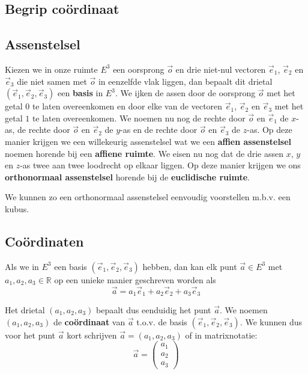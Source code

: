 \documentclass[12pt,twoside]{article}
\begin{document}
\begin{theorie}

\pagebreak
\section{Begrip coördinaat}

\subsection{Assenstelsel}

Kiezen we in onze ruimte $E^3$ een oorsprong $\vec{o}$ en drie niet-nul vectoren $\vec{e}_1$, $\vec{e}_2$ en $\vec{e}_3$ die niet samen met $\vec{o}$ in eenzelfde vlak liggen, dan bepaalt dit drietal $(\vec{e}_1, \vec{e}_2, \vec{e}_3)$ een {\bf basis} in $E^3$. We ijken de assen door de oorsprong $\vec{o}$ met het getal $0$ te laten overeenkomen en door elke van de vectoren $\vec{e}_1$, $\vec{e}_2$ en $\vec{e}_3$ met het getal $1$ te laten overeenkomen. We noemen nu nog de rechte door $\vec{o}$ en $\vec{e}_1$ de $x$-as, de rechte door $\vec{o}$ en $\vec{e}_2$ de $y$-as en de rechte door $\vec{o}$ en $\vec{e}_3$ de $z$-as. Op deze manier krijgen we een willekeurig assenstelsel wat we een {\bf affien assenstelsel} noemen horende bij een {\bf affiene ruimte}. We eisen nu nog dat de drie assen $x$, $y$ en $z$-as twee aan twee loodrecht op elkaar liggen. Op deze manier krijgen we ons {\bf orthonormaal assenstelsel} horende bij de {\bf euclidische ruimte}.

We kunnen zo een orthonormaal assenstelsel eenvoudig voorstellen m.b.v. een kubus.

\subsection{Coördinaten}

Als we in $E^3$ een basis $(\vec{e}_1, \vec{e}_2, \vec{e}_3)$ hebben, dan kan elk punt $\vec{a}\in E^3$ met $a_1, a_2, a_3 \in \mathbb{R}$ op een unieke manier geschreven worden als
$$\vec{a} = a_1\vec{e}_1 + a_2\vec{e}_2 + a_3\vec{e}_3$$

Het drietal $(a_1, a_2, a_3)$ bepaalt dus eenduidig het punt $\vec{a}$. We noemen $(a_1, a_2, a_3)$ de {\bf coördinaat} van $\vec{a}$ t.o.v. de basis $(\vec{e}_1, \vec{e}_2, \vec{e}_3)$. We kunnen dus voor het punt $\vec{a}$ kort schrijven $\vec{a}=(a_1, a_2, a_3)$ of in matrixnotatie:
$$\vec{a}=\begin{pmatrix}a_1\\a_2\\a_3\end{pmatrix}$$


\end{theorie}
\end{document}

